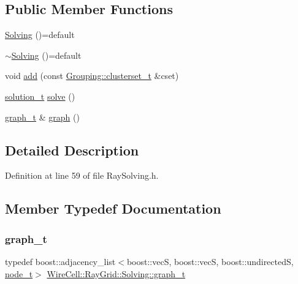 \subsection*{Public Member Functions}
\begin{DoxyCompactItemize}
\item 
\hyperlink{class_wire_cell_1_1_ray_grid_1_1_solving_aed2c404897e77942c2c38bec80b4cd73}{Solving} ()=default
\item 
\hyperlink{class_wire_cell_1_1_ray_grid_1_1_solving_a631b4d10c93ab68c3e80d8f98a63cb04}{$\sim$\+Solving} ()=default
\item 
void \hyperlink{class_wire_cell_1_1_ray_grid_1_1_solving_acc6a071b6551c07e799bc36fddc0fef3}{add} (const \hyperlink{class_wire_cell_1_1_ray_grid_1_1_grouping_a0a4ee47c906176803dd7b3e42803d0ed}{Grouping\+::clusterset\+\_\+t} \&cset)
\item 
\hyperlink{class_wire_cell_1_1_ray_grid_1_1_solving_a51d0173e0e992f53ab92b27f72d65629}{solution\+\_\+t} \hyperlink{class_wire_cell_1_1_ray_grid_1_1_solving_afbccf47ec02f686eb9e5ebec398ee467}{solve} ()
\item 
\hyperlink{class_wire_cell_1_1_ray_grid_1_1_solving_ac9cb5afd9b0590c4671a239347dc5e34}{graph\+\_\+t} \& \hyperlink{class_wire_cell_1_1_ray_grid_1_1_solving_a866d05a9071d9d0bf1a08402587b3b76}{graph} ()
\end{DoxyCompactItemize}


\subsection{Detailed Description}


Definition at line 59 of file Ray\+Solving.\+h.



\subsection{Member Typedef Documentation}
\mbox{\label{class_wire_cell_1_1_ray_grid_1_1_solving_ac9cb5afd9b0590c4671a239347dc5e34}} 
\subsubsection{\texorpdfstring{graph\+\_\+t}{graph\_t}}
{\footnotesize\ttfamily typedef boost\+::adjacency\+\_\+list$<$boost\+::vecS, boost\+::vecS, boost\+::undirectedS, \hyperlink{struct_wire_cell_1_1_ray_grid_1_1_solving_1_1node__t}{node\+\_\+t}$>$ \hyperlink{class_wire_cell_1_1_ray_grid_1_1_solving_ac9cb5afd9b0590c4671a239347dc5e34}{Wire\+Cell\+::\+Ray\+Grid\+::\+Solving\+::graph\+\_\+t}}




